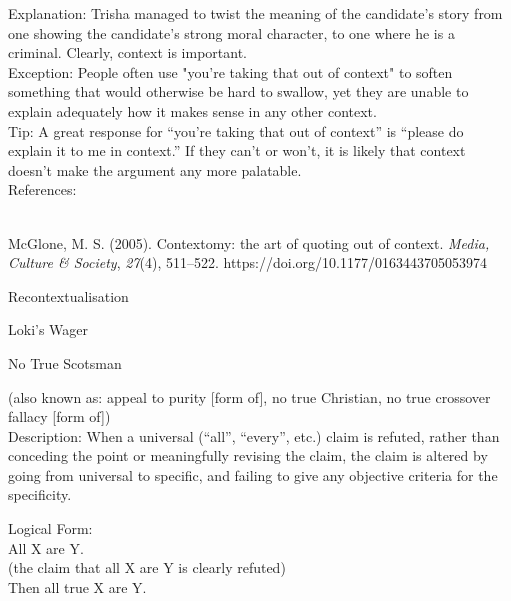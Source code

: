 \documentclass[a4paper,12pt,single,pdftex]{scrartcl}
\begin{document}
    
      Explanation: Trisha managed to twist the meaning of the candidate's story from one showing the candidate's strong moral character, to one where he is a criminal. Clearly, context is important.
    \\

    
      Exception: People often use "you're taking that out of context" to soften something that would otherwise be hard to swallow, yet they are unable to explain adequately how it makes sense in any other context.
    \\

    
      Tip: A great response for “you’re taking that out of context” is “please do explain it to me in context.” If they can’t or won’t, it is likely that context doesn’t make the argument any more palatable.
    \\

    References:

    
      
        
      \\

      
        
          McGlone, M. S. (2005). Contextomy: the art of quoting out of context. {\it Media, Culture \& Society}, {\it 27}(4), 511–522. https://doi.org/10.1177/0163443705053974
        
      
    
  

Recontextualisation

Loki's Wager

No True Scotsman
    
      (also known as: appeal to purity [form of], no true Christian, no true crossover fallacy [form of])
    \\

  
    Description: When a universal (“all”, “every”, etc.) claim is refuted, rather than conceding the point or meaningfully revising the claim, the claim is altered by going from universal to specific, and failing to give any objective criteria for the specificity.

    
      Logical Form:
    \\

    
      All X are Y.
    \\

    
      (the claim that all X are Y is clearly refuted)
    \\

    
      Then all true X are Y.
    \\
\end{document}
